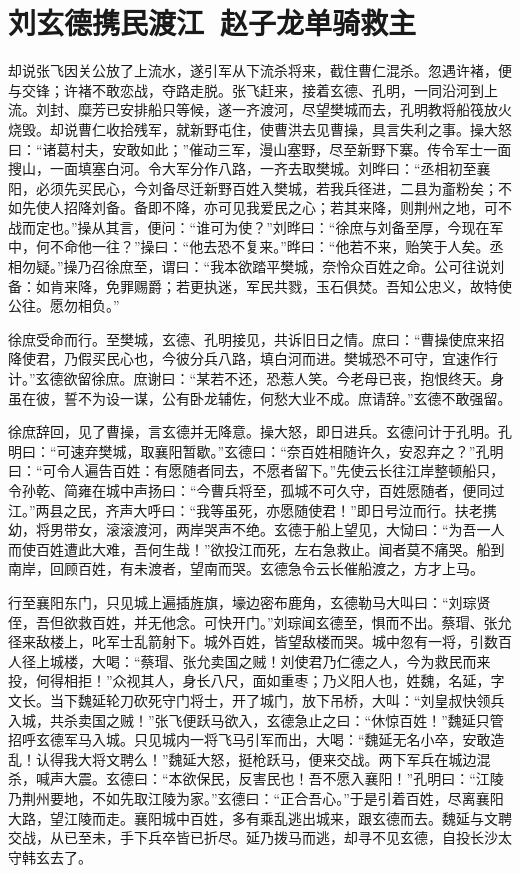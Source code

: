 \chapter{刘玄德携民渡江~赵子龙单骑救主}

却说张飞因关公放了上流水，遂引军从下流杀将来，截住曹仁混杀。忽遇许褚，便与交锋；许褚不敢恋战，夺路走脱。张飞赶来，接着玄德、孔明，一同沿河到上流。刘封、糜芳已安排船只等候，遂一齐渡河，尽望樊城而去，孔明教将船筏放火烧毁。却说曹仁收拾残军，就新野屯住，使曹洪去见曹操，具言失利之事。操大怒曰：“诸葛村夫，安敢如此；”催动三军，漫山塞野，尽至新野下寨。传令军士一面搜山，一面填塞白河。令大军分作八路，一齐去取樊城。刘晔曰：“丞相初至襄阳，必须先买民心，今刘备尽迁新野百姓入樊城，若我兵径进，二县为齑粉矣；不如先使人招降刘备。备即不降，亦可见我爱民之心；若其来降，则荆州之地，可不战而定也。”操从其言，便问：“谁可为使？”刘晔曰：“徐庶与刘备至厚，今现在军中，何不命他一往？”操曰：“他去恐不复来。”晔曰：“他若不来，贻笑于人矣。丞相勿疑。”操乃召徐庶至，谓曰：“我本欲踏平樊城，奈怜众百姓之命。公可往说刘备：如肯来降，免罪赐爵；若更执迷，军民共戮，玉石俱焚。吾知公忠义，故特使公往。愿勿相负。”

徐庶受命而行。至樊城，玄德、孔明接见，共诉旧日之情。庶曰：“曹操使庶来招降使君，乃假买民心也，今彼分兵八路，填白河而进。樊城恐不可守，宜速作行计。”玄德欲留徐庶。庶谢曰：“某若不还，恐惹人笑。今老母已丧，抱恨终天。身虽在彼，誓不为设一谋，公有卧龙辅佐，何愁大业不成。庶请辞。”玄德不敢强留。

徐庶辞回，见了曹操，言玄德并无降意。操大怒，即日进兵。玄德问计于孔明。孔明曰：“可速弃樊城，取襄阳暂歇。”玄德曰：“奈百姓相随许久，安忍弃之？”孔明曰：“可令人遍告百姓：有愿随者同去，不愿者留下。”先使云长往江岸整顿船只，令孙乾、简雍在城中声扬曰：“今曹兵将至，孤城不可久守，百姓愿随者，便同过江。”两县之民，齐声大呼曰：“我等虽死，亦愿随使君！”即日号泣而行。扶老携幼，将男带女，滚滚渡河，两岸哭声不绝。玄德于船上望见，大恸曰：“为吾一人而使百姓遭此大难，吾何生哉！”欲投江而死，左右急救止。闻者莫不痛哭。船到南岸，回顾百姓，有未渡者，望南而哭。玄德急令云长催船渡之，方才上马。

行至襄阳东门，只见城上遍插旌旗，壕边密布鹿角，玄德勒马大叫曰：“刘琮贤侄，吾但欲救百姓，并无他念。可快开门。”刘琮闻玄德至，惧而不出。蔡瑁、张允径来敌楼上，叱军士乱箭射下。城外百姓，皆望敌楼而哭。城中忽有一将，引数百人径上城楼，大喝：“蔡瑁、张允卖国之贼！刘使君乃仁德之人，今为救民而来投，何得相拒！”众视其人，身长八尺，面如重枣；乃义阳人也，姓魏，名延，字文长。当下魏延轮刀砍死守门将士，开了城门，放下吊桥，大叫：“刘皇叔快领兵入城，共杀卖国之贼！”张飞便跃马欲入，玄德急止之曰：“休惊百姓！”魏延只管招呼玄德军马入城。只见城内一将飞马引军而出，大喝：“魏延无名小卒，安敢造乱！认得我大将文聘么！”魏延大怒，挺枪跃马，便来交战。两下军兵在城边混杀，喊声大震。玄德曰：“本欲保民，反害民也！吾不愿入襄阳！”孔明曰：“江陵乃荆州要地，不如先取江陵为家。”玄德曰：“正合吾心。”于是引着百姓，尽离襄阳大路，望江陵而走。襄阳城中百姓，多有乘乱逃出城来，跟玄德而去。魏延与文聘交战，从已至未，手下兵卒皆已折尽。延乃拨马而逃，却寻不见玄德，自投长沙太守韩玄去了。

